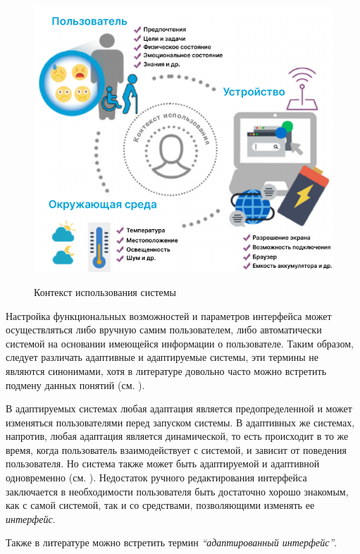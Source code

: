 \begin{figure}[H]
	\centering
	\caption{Контекст использования системы}
	\includegraphics[scale=0.5]{author/part4/figures/user-context.png}
	\label{fig:use_context}
\end{figure}

Настройка функциональных возможностей и параметров интерфейса может осуществляться либо вручную самим пользователем, либо автоматически системой на основании имеющейся информации о пользователе. Таким образом, следует различать адаптивные и адаптируемые системы, эти термины не являются синонимами, хотя в литературе довольно часто можно встретить подмену данных понятий (см. ).

В адаптируемых системах любая адаптация является предопределенной и может изменяться пользователями перед запуском системы. В адаптивных же системах, напротив, любая адаптация является динамической, то есть происходит в то же время, когда пользователь взаимодействует с системой, и зависит от поведения пользователя. Но система также может быть адаптируемой и адаптивной одновременно (см. ).
Недостаток ручного редактирования интерфейса заключается в необходимости пользователя быть достаточно хорошо знакомым, как с самой системой, так и со средствами, позволяющими изменять ее \textit{интерфейс}.

Также в литературе можно встретить термин \textit{``адаптированный интерфейс''}. 

